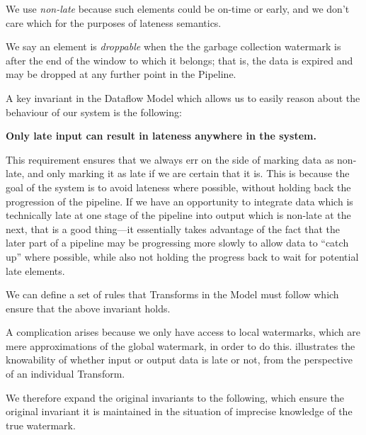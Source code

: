 \footnotetext
{
We use \emph{non-late} because such elements could be on-time or early, and we don't care which for the purposes of lateness semantics.
}

We say an element is \emph{droppable} when the the garbage collection watermark is after the end of the window to which it belongs; that is, the data is expired and may be dropped at any further point in the Pipeline.

A key invariant in the Dataflow Model which allows us to easily reason about the behaviour of our system is the following:

\textbf{Only late input can result in lateness anywhere in the system.}

This requirement ensures that we always err on the side of marking data as non-late, and only marking it as late if we are certain that it is.
This is because the goal of the system is to avoid lateness where possible, without holding back the progression of the pipeline.
If we have an opportunity to integrate data which is technically late at one stage of the pipeline into output which is non-late at the next, that is a good thing---it essentially takes advantage of the fact that the later part of a pipeline may be progressing more slowly to allow data to ``catch up'' where possible, while also not holding the progress back to wait for potential late elements.

We can define a set of rules that Transforms in the Model must follow which ensure that the above invariant holds.

A complication arises because we only have access to local watermarks, which are mere approximations of the global watermark, in order to do this.
 illustrates the knowability of whether input or output data is late or not, from the perspective of an individual Transform.


We therefore expand the original invariants to the following, which ensure the original invariant it is maintained in the situation of imprecise knowledge of the true watermark.


